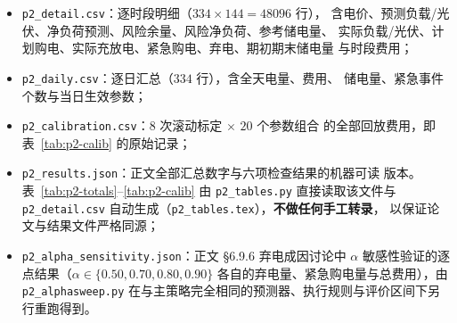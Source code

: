 \documentclass[withoutpreface,bwprint]{cumcmthesis}
\begin{document}
\begin{appendices}
\begin{itemize}
  \item \texttt{p2\_detail.csv}：逐时段明细（$334\times144=48096$ 行），
        含电价、预测负载/光伏、净负荷预测、风险余量、风险净负荷、参考储电量、
        实际负载/光伏、计划购电、实际充放电、紧急购电、弃电、期初期末储电量
        与时段费用；
  \item \texttt{p2\_daily.csv}：逐日汇总（$334$ 行），含全天电量、费用、
        储电量、紧急事件个数与当日生效参数；
  \item \texttt{p2\_calibration.csv}：$8$ 次滚动标定 $\times$ $20$ 个参数组合
        的全部回放费用，即表~\ref{tab:p2-calib} 的原始记录；
  \item \texttt{p2\_results.json}：正文全部汇总数字与六项检查结果的机器可读
        版本。表~\ref{tab:p2-totals}--\ref{tab:p2-calib} 由
        \texttt{p2\_tables.py} 直接读取该文件与 \texttt{p2\_detail.csv}
        自动生成（\texttt{p2\_tables.tex}），\textbf{不做任何手工转录}，
        以保证论文与结果文件严格同源；
  \item \texttt{p2\_alpha\_sensitivity.json}：正文 §6.9.6 弃电成因讨论中
        $\alpha$ 敏感性验证的逐点结果（$\alpha\in\{0.50,0.70,0.80,0.90\}$
        各自的弃电量、紧急购电量与总费用），由 \texttt{p2\_alphasweep.py}
        在与主策略完全相同的预测器、执行规则与评价区间下另行重跑得到。
\end{itemize}

\end{appendices}
\end{document}
